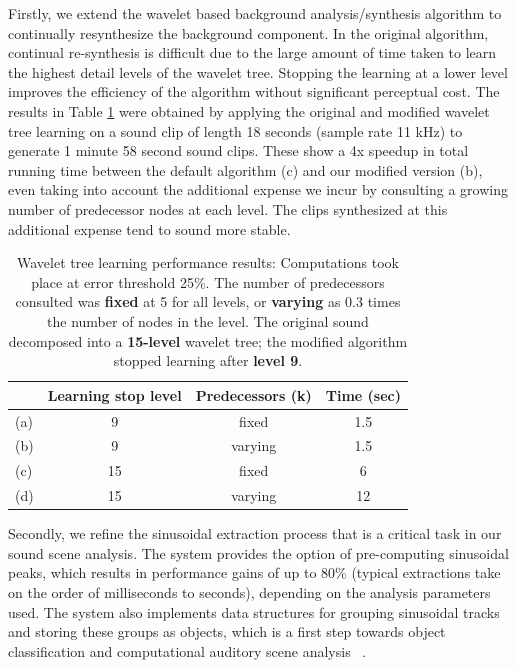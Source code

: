 \documentclass[review]{acmsiggraph}      %
\begin{document}
Firstly, we extend the wavelet based background analysis/synthesis algorithm to 
continually resynthesize the background component. In the original algorithm, continual 
re-synthesis is difficult due to the large amount of time taken to learn the highest detail 
levels of the wavelet tree. Stopping the learning at a lower level improves 
the efficiency of the algorithm without significant perceptual cost. The results
in Table 
\ref{tab:treesynth} were obtained by applying the 
original and modified wavelet tree learning on a sound clip of length 18 seconds (sample rate 
11 kHz) to generate 1 minute 58 second sound clips. These show a 4x speedup in 
total running time between the default algorithm (c) and our modified version (b), even 
taking into account the additional expense we incur by consulting a growing number of 
predecessor nodes at each level. The clips synthesized at this additional expense tend to 
sound more stable.

\begin{table}[h]
\begin{center}
\begin{tabular}{|l|c|c|c|}
\hline
  & Learning stop level & Predecessors (k) & Time (sec) \\ \hline
(a) & 9 & fixed & 1.5 \\
(b) & 9 & varying & 1.5 \\
(c) & 15 & fixed & 6 \\
(d) & 15 & varying & 12 \\ \hline
\end{tabular}
\caption{Wavelet tree learning performance results: 
Computations took place at error threshold 25\%. The number of predecessors 
consulted was {\bf fixed} at 5 for all levels, or {\bf varying} as 0.3 times 
the number of nodes in the level. The original sound decomposed into a {\bf 15-level} 
wavelet tree; the modified algorithm stopped learning after {\bf level 9}.} 
\label{tab:treesynth}
\end{center}
\end{table}

Secondly, we refine the sinusoidal extraction process that is a critical task in our sound 
scene analysis. The system provides the option of pre-computing sinusoidal peaks, which
results in performance gains of up to 80\% (typical extractions take on the order of milliseconds to seconds), depending on the analysis parameters used. The 
system also 
implements data structures for grouping sinusoidal tracks and storing these groups as 
objects, which is a first step towards object classification and computational auditory scene analysis ~\cite{Bregman90}. 
\end{document}
